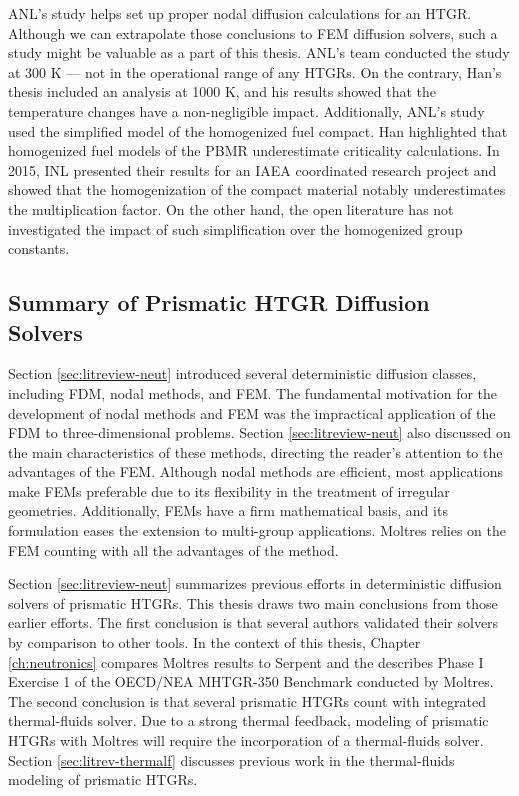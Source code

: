 ANL's study helps set up proper nodal diffusion calculations for an \gls{HTGR}.
Although we can extrapolate those conclusions to \gls{FEM} diffusion solvers, such a study might be valuable as a part of this thesis.
ANL's team conducted the study at 300 K --- not in the operational range of any \glspl{HTGR}.
On the contrary, Han's thesis included an analysis at 1000 K, and his results showed that the temperature changes have a non-negligible impact.
Additionally, ANL's study used the simplified model of the homogenized fuel compact.
Han highlighted that homogenized fuel models of the \gls{PBMR} underestimate criticality calculations.
In 2015, \gls{INL} presented their results \cite{strydom_results_2015} for an \gls{IAEA} coordinated research project \cite{tyobeka_htgr_2011} and showed that the homogenization of the compact material notably underestimates the multiplication factor.
On the other hand, the open literature has not investigated the impact of such simplification over the homogenized group constants.

\subsection{Summary of Prismatic HTGR Diffusion Solvers}

Section \ref{sec:litreview-neut} introduced several deterministic diffusion classes, including FDM, nodal methods, and FEM.
The fundamental motivation for the development of nodal methods and FEM was the impractical application of the \gls{FDM} to three-dimensional problems.
Section \ref{sec:litreview-neut} also discussed on the main characteristics of these methods, directing the reader's attention to the advantages of the FEM.
Although nodal methods are efficient, most applications make FEMs preferable due to its flexibility in the treatment of irregular geometries.
Additionally, FEMs have a firm mathematical basis, and its formulation eases the extension to multi-group applications.
Moltres relies on the FEM counting with all the advantages of the method.

Section \ref{sec:litreview-neut} summarizes previous efforts in deterministic diffusion solvers of prismatic HTGRs.
This thesis draws two main conclusions from those earlier efforts.
The first conclusion is that several authors validated their solvers by comparison to other tools.
In the context of this thesis, Chapter \ref{ch:neutronics} compares Moltres results to Serpent and the describes Phase I Exercise 1 of the OECD/NEA MHTGR-350 Benchmark conducted by Moltres.
The second conclusion is that several prismatic HTGRs count with integrated thermal-fluids solver.
Due to a strong thermal feedback, modeling of prismatic HTGRs with Moltres will require the incorporation of a thermal-fluids solver.
Section \ref{sec:litrev-thermalf} discusses previous work in the thermal-fluids modeling of prismatic HTGRs.

